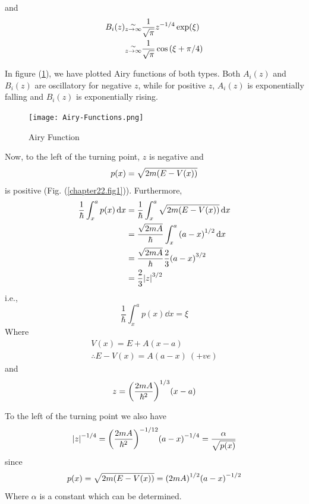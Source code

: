 and 
\begin{align}
B_i(z) &\substack{\sim \\ z \rightarrow \infty} \frac{1}{\sqrt{\pi}} z^{-1/4} \exp(\xi) \nonumber \\
&\substack{\sim \\ z \rightarrow \infty} \frac{1}{\sqrt{\pi}} \cos\qty(\xi + \pi / 4)
\label{chapter22.eqn35}
\end{align}

In figure (\ref{chapter22.fig2}), we have plotted Airy functions of both types. Both $A_i(z)$ and $B_i(z)$ are oscillatory for negative $z$, while for positive $z$, $A_i(z)$ is exponentially falling and $B_i(z)$ is exponentially rising.

\begin{figure}
	\centering
	\texttt{[image: Airy-Functions.png]}
	\caption{Airy Function}
	\label{chapter22.fig2}
\end{figure}
Now, to the left of the turning point, $z$ is negative and 
\begin{equation}
	p(x) = \sqrt{2 m \qty(E - V(x))}
\end{equation}
is positive (Fig. (\ref{chapter22.fig1})). Furthermore,
\begin{align*}
	\frac{1}{\hbar} \int_{x}^{a} p(x) \dd{x} 
	&= \frac{1}{\hbar} \int_{x}^{a} \sqrt{2 m \qty(E - V(x))} \dd{x} \\
	&= \frac{\sqrt{2 m A}}{\hbar} \int_{x}^{a} \qty(a - x)^{1/2} \dd{x} \\
	&= \frac{\sqrt{2 m A}}{\hbar} \frac{2}{3} \qty(a - x)^{3/2} \\
	&= \frac{2}{3} \abs{z}^{3/2}
\end{align*}
i.e.,
\begin{equation}
\label{chapter22.eqn36}
	\frac{1}{\hbar} \int_{x}^{a} p(x) \dd{x} = \xi
\end{equation}
Where 
\begin{align*}
V(x) = E + A (x-a) \\
\therefore E-V(x) = A(a-x) \ (+ ve)
\end{align*}
and
\begin{equation*}
z = \qty(\frac{2 m A}{\hbar^2})^{1/3} \qty(x-a)
\end{equation*}

To the left of the turning point we also have
\begin{equation}
\abs{z}^{-1/4} = \qty(\frac{2 m A}{\hbar^2})^{-1/12} \qty(a - x)^{-1/4} = \frac{\alpha}{\sqrt{p(x)}}
\end{equation}
since
\begin{equation}
p(x) = \sqrt{2m \qty(E - V(x))} = \qty(2 m A)^{1/2} \qty(a - x)^{-1/2}
\end{equation}
Where $\alpha$ is a constant which can be determined.\\

